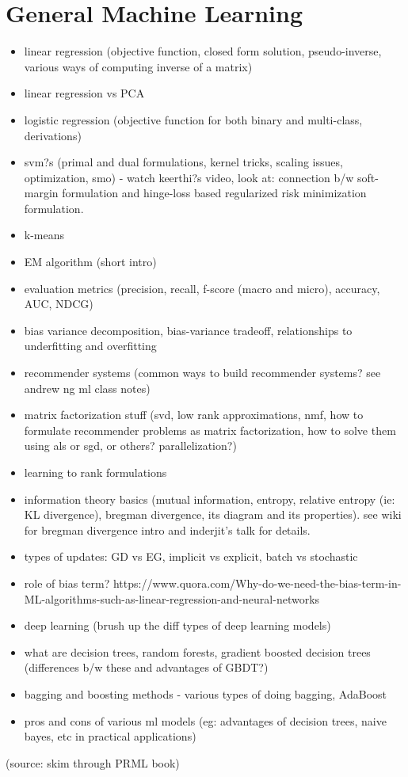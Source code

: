 \documentclass[english, 11pt]{article}
\begin{document}
\section{General Machine Learning}
\begin{itemize}
\item linear regression (objective function, closed form solution, pseudo-inverse, various ways of computing inverse of a matrix)
\item linear regression vs PCA
\item logistic regression (objective function for both binary and multi-class, derivations)
\item svm?s (primal and dual formulations, kernel tricks, scaling issues, optimization, smo) - watch keerthi?s video, look at: connection b/w soft-margin formulation and hinge-loss based regularized risk minimization formulation.
\item k-means
\item EM algorithm (short intro)
\item evaluation metrics (precision, recall, f-score (macro and micro), accuracy, AUC, NDCG)
\item bias variance decomposition, bias-variance tradeoff, relationships to underfitting and overfitting
\item recommender systems (common ways to build recommender systems? see andrew ng ml class notes)
\item matrix factorization stuff (svd, low rank approximations, nmf, how to formulate recommender problems as matrix factorization, how to solve them using als or sgd, or others? parallelization?)
\item learning to rank formulations
\item information theory basics (mutual information, entropy, relative entropy (ie: KL divergence), bregman divergence, its diagram and its properties). see wiki for bregman divergence intro and inderjit's talk for details.
\item types of updates: GD vs EG, implicit vs explicit, batch vs stochastic
\item role of bias term? https://www.quora.com/Why-do-we-need-the-bias-term-in-ML-algorithms-such-as-linear-regression-and-neural-networks
\item deep learning (brush up the diff types of deep learning models)
\item what are decision trees, random forests, gradient boosted decision trees (differences b/w these and advantages of GBDT?)
\item bagging and boosting methods - various types of doing bagging, AdaBoost
\item pros and cons of various ml models (eg: advantages of decision trees, naive bayes, etc in practical applications)
\end{itemize}
(source: skim through PRML book)
\end{document}
